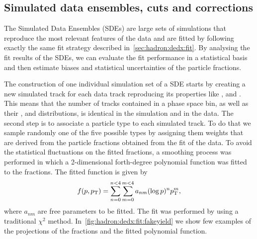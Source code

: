 \subsection{Simulated data ensembles, cuts and corrections}
\label{sec:hadron:dedx:sde}


The Simulated Data Ensembles (SDEs) are large sets of
simulations that reproduce the most relevant
features of the data and are fitted by following
exactly the same fit strategy described in~\cref{sec:hadron:dedx:fit}.
By analysing the fit results of the SDEs, we can evaluate the fit
performance in a statistical basis and then estimate biases
and statistical uncertainties of the particle fractions. 

The construction of one individual simulation set of a SDE starts
by creating a new simulated track for each data track reproducing
its properties like \pp, \pT and \ncl. This means that the number of
tracks contained in a phase space bin, as well as their \pp, \pT and
\ncl distributions, is identical in the simulation and in the data.
The second step is to associate a particle type to each simulated track.
To do that we sample randomly one of the five possible types
by assigning them weights that are derived from the particle fractions
obtained from the \dedx fit of the data.
To avoid the statistical fluctuations on the fitted fractions,
a smoothing process was performed in which a 2-dimensional
forth-degree polynomial function was fitted to the fractions.
The fitted function is given by
\begin{equation}
  f(p,p_\text{T}) = \sum_{n=0}^{n<4} \sum_{m=0}^{m<4} a_{nm} (\log p)^n p_\text{T}^m,
  \label{eq:hadron:dedx:pol}
\end{equation}
where $a_{nm}$ are free parameters to be fitted.
The fit was performed by using a traditional $\chi^2$ method.
In~\cref{fig:hadron:dedx:fit:fakeyield} we show few examples
of the \pT projections of the fractions and the fitted
polynomial function. 


